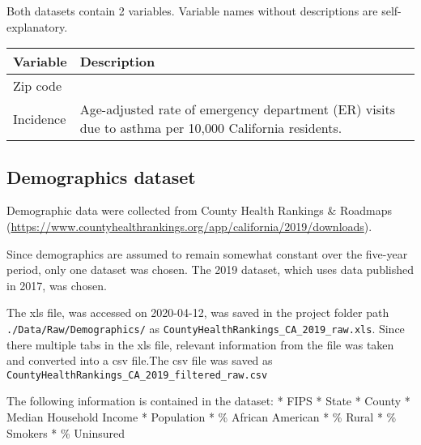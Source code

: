 \documentclass[12pt,]{article}
\begin{document}
Both datasets contain 2 variables. Variable names without descriptions
are self-explanatory.

\begin{longtable}[]{@{}ll@{}}
\toprule
\begin{minipage}[b]{0.47\columnwidth}\raggedright
Variable\strut
\end{minipage} & \begin{minipage}[b]{0.47\columnwidth}\raggedright
Description\strut
\end{minipage}\tabularnewline
\midrule
\endhead
\begin{minipage}[t]{0.47\columnwidth}\raggedright
Zip code\strut
\end{minipage} & \begin{minipage}[t]{0.47\columnwidth}\raggedright
\strut
\end{minipage}\tabularnewline
\begin{minipage}[t]{0.47\columnwidth}\raggedright
Incidence\strut
\end{minipage} & \begin{minipage}[t]{0.47\columnwidth}\raggedright
Age-adjusted rate of emergency department (ER) visits due to asthma per
10,000 California residents.\strut
\end{minipage}\tabularnewline
\bottomrule
\end{longtable}

\hypertarget{demographics-dataset}{%
\subsection{Demographics dataset}\label{demographics-dataset}}

Demographic data were collected from County Health Rankings \& Roadmaps
(\url{https://www.countyhealthrankings.org/app/california/2019/downloads}).

Since demographics are assumed to remain somewhat constant over the
five-year period, only one dataset was chosen. The 2019 dataset, which
uses data published in 2017, was chosen.

The xls file, was accessed on 2020-04-12, was saved in the project
folder path \texttt{./Data/Raw/Demographics/} as
\texttt{CountyHealthRankings\_CA\_2019\_raw.xls}. Since there multiple
tabs in the xls file, relevant information from the file was taken and
converted into a csv file.The csv file was saved as
\texttt{CountyHealthRankings\_CA\_2019\_filtered\_raw.csv}

The following information is contained in the dataset: * FIPS * State *
County * Median Household Income * Population * \% African American * \%
Rural * \% Smokers * \% Uninsured
\end{document}
